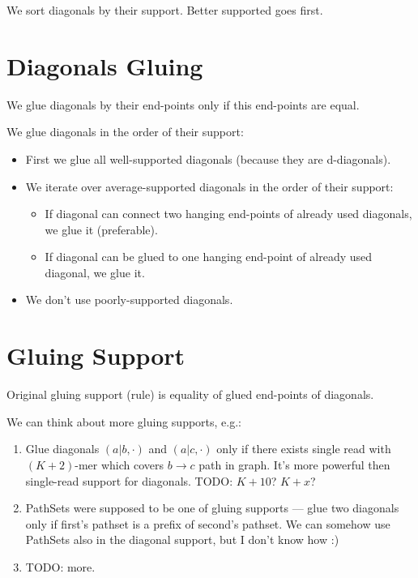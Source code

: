 \documentclass[a4paper]{article}
\begin{document}
We sort diagonals by their support. Better supported goes first.

\section{Diagonals Gluing}

We glue diagonals by their end-points only if this end-points are equal.

We glue diagonals in the order of their support:
\begin{itemize}
\item First we glue all well-supported diagonals (because they are d-diagonals).
\item We iterate over average-supported diagonals in the order of their support:
\begin{itemize}
\item If diagonal can connect two hanging end-points of already used diagonals, we glue it (preferable).
\item If diagonal can be glued to one hanging end-point of already used diagonal, we glue it.
\end{itemize}
\item We don't use poorly-supported diagonals.
\end{itemize}

\section{Gluing Support}

Original gluing support (rule) is equality of glued end-points of diagonals.

We can think about more gluing supports, e.g.:
\begin{enumerate}
\item Glue diagonals $(a|b, \cdot)$ and $(a|c, \cdot)$ only if there exists single read with $(K+2)$-mer which covers $b \rightarrow c$ path in graph. It's more powerful then single-read support for diagonals. TODO: $K+10$? $K+x$?
\item PathSets were supposed to be one of gluing supports --- glue two diagonals only if first's pathset is a prefix of second's pathset. We can somehow use PathSets also in the diagonal support, but I don't know how :)
\item TODO: more.
\end{enumerate}





\end{document}
